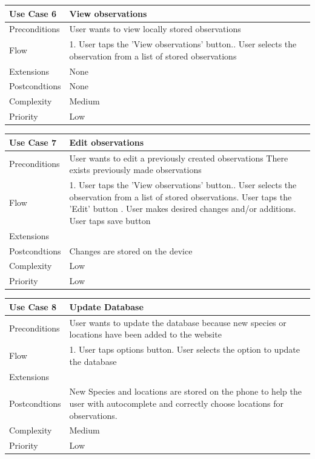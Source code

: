 \hspace{2em}

\begin{tabular}[t]{|l|p{}|}\hline
	Use Case 6&View observations\\\hline
	Preconditions&User wants to view locally stored observations\\\hline
	Flow&1. User taps the 'View observations' button.\newline
	2. User selects the observation from a list of stored observations \\\hline
	Extensions&None \\\hline
	Postcondtions&None\\\hline
	Complexity&Medium\\\hline
	Priority&Low\\\hline
\end{tabular}

\hspace{2em}

\begin{tabular}[t]{|l|p{}|}\hline
	Use Case 7&Edit observations\\\hline
	Preconditions&User wants to edit a previously created observations\newline 
	There exists previously made observations\\\hline
	Flow&1. User taps the 'View observations' button.\newline
	2. User selects the observation from a list of stored observations\newline
	3. User taps the 'Edit' button \newline
	4. User makes desired changes and/or additions\newline
	5. User taps save button\\\hline
	Extensions& \\\hline
	Postcondtions&Changes are stored on the device\\\hline
	Complexity&Low\\\hline
	Priority&Low\\\hline
\end{tabular}

\hspace{2em}

\begin{tabular}[t]{|l|p{}|}\hline
	Use Case 8&Update Database\\\hline
	Preconditions&User wants to update the database because new species or 
	locations have been added to the website\\\hline
	Flow&1. User taps options button\newline
	2. User selects the option to update the database\\\hline
	Extensions& \\\hline
	Postcondtions&New Species and locations are stored on the phone to help
	the user with autocomplete and correctly choose locations for observations.\\\hline
	Complexity&Medium\\\hline
	Priority&Low\\\hline
\end{tabular}
